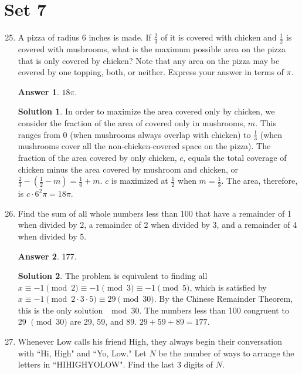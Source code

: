 \documentclass[11pt]{article}
\theoremstyle{definition}
\newtheorem*{solution}{Solution}
\newtheorem*{answer}{Answer}
\begin{document}
\section*{Set 7}
\begin{enumerate}
\setcounter{enumi}{24}

\item A pizza of radius 6 inches is made. If $\frac{2}{3}$ of it is covered with chicken and $\frac{1}{2}$ is covered with mushrooms, what is the maximum possible area on the pizza that is only covered by chicken? Note that any area on the pizza may be covered by one topping, both, or neither. Express your answer in terms of $\pi$.

\begin{answer}
$18 \pi$.
\end{answer}
\begin{solution} In order to maximize the area covered only by chicken, we consider the fraction of the area of covered only in mushrooms, $m$. This ranges from 0 (when mushrooms always overlap with chicken) to $\frac{1}{3}$ (when mushrooms cover all the non-chicken-covered space on the pizza). The fraction of the area covered by only chicken, $c$, equals the total coverage of chicken minus the area covered by mushroom and chicken, or $\frac{2}{3} - (\frac{1}{2} - m) = \frac{1}{6} + m$. $c$ is maximized at $\frac{1}{2}$ when $m = \frac{1}{3}$. The area, therefore, is $c \cdot 6^2 \pi = \boxed{18 \pi}$.

\end{solution}

\item Find the sum of all whole numbers less than 100 that have a remainder of 1 when divided by 2, a remainder of 2 when divided by 3, and a remainder of 4 when divided by 5.

\begin{answer}
177.
\end{answer}
\begin{solution} The problem is equivalent to finding all $x \equiv -1 \pmod{2} \equiv -1 \pmod{3} \equiv -1 \pmod{5}$, which is satisfied by $x \equiv -1 \pmod{2 \cdot 3 \cdot 5} \equiv 29 \pmod{30}$. By the Chinese Remainder Theorem, this is the only solution $\mod{30}$. The numbers less than 100 congruent to 29 $\pmod{30}$ are 29, 59, and 89. $29 + 59 + 89 = \boxed{177}$.

\end{solution}

\item Whenever Low calls his friend High, they always begin their conversation with ``Hi, High" and ``Yo, Low." Let $N$ be the number of ways to arrange the letters in ``HIHIGHYOLOW". Find the last 3 digits of $N$.


\end{enumerate}
\end{document}
